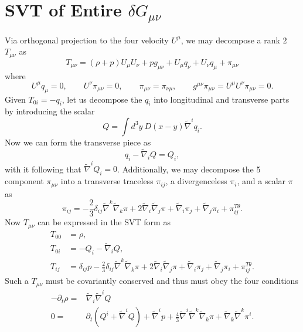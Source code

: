 \documentclass[10pt,letterpaper]{article}
\numberwithin{equation}{subsection}
\begin{document}
\section{SVT of Entire $\delta G_{\mu\nu}$}
Via orthogonal projection to the four velocity $U^\mu$, we may decompose a rank 2 $T_{\mu\nu}$ as
\begin{equation}
T_{\mu\nu} = (\rho+p)U_\mu U_\nu + p g_{\mu\nu} + U_\mu q_\nu + U_\nu q_\mu + \pi_{\mu\nu}
\end{equation}
where
\begin{equation}
	U^\mu q_{\mu} = 0,\qquad U^\nu \pi_{\mu\nu} = 0,\qquad \pi_{\mu\nu} = \pi_{\nu\mu},\qquad g^{\mu\nu}\pi_{\mu\nu} =U^\mu U^\nu \pi_{\mu\nu} = 0.
\end{equation}
Given $ T_{0i} = -q_i$, let us decompose the $q_i$ into longitudinal and transverse parts by introducing the scalar
\begin{equation}
Q = \int d^3y\ D(x-y)\tilde\nabla^i q_i.
\end{equation}
Now we can form the transverse piece as
\begin{equation}
q_i -  \tilde\nabla_i Q = Q_i,
\end{equation}
with it following that $\tilde\nabla^i Q_i = 0$. Additionally, we may decompose the 5 component $\pi_{\mu\nu}$ into a transverse traceless $\pi_{ij}$, a divergenceless $\pi_i$, and a scalar $\pi$ as
\begin{equation}
	\pi_{ij} = -\frac{2}{3} \delta_{ij}\tilde\nabla^k \tilde\nabla_k \pi  + 2\tilde\nabla_i\tilde\nabla_j \pi + \tilde\nabla_i \pi_j + \tilde\nabla_j \pi_i + \pi_{ij}^{T\theta}.
\end{equation}
Now $ T_{\mu\nu}$ can be expressed in the SVT form as
\begin{align}
 T_{00}  &= \rho,
\nonumber\\	
 T_{0i} &= -Q_i - \tilde\nabla_i Q,
\nonumber\\	
 T_{ij}  &= \delta_{ij}  p -\frac{2}{3} \delta_{ij}\tilde\nabla^k \tilde\nabla_k \pi + 2\tilde\nabla_i\tilde\nabla_j \pi + \tilde\nabla_i \pi_j + \tilde\nabla_j \pi_i + \pi_{ij}^{T\theta}.
\end{align} 
Such a $ T_{\mu\nu}$ must be covariantly conserved and thus must obey the four conditions
\begin{align}
-\partial_t\rho = &{} \tilde\nabla_i \tilde\nabla^i Q\\
0 = &{} \partial_t (Q^i + \tilde\nabla^i Q) + \tilde\nabla^i  p +\frac43 \tilde\nabla^i \tilde\nabla^k \tilde\nabla_k \pi + \tilde\nabla_k \tilde\nabla^k \pi^i.
\end{align}
\end{document}

